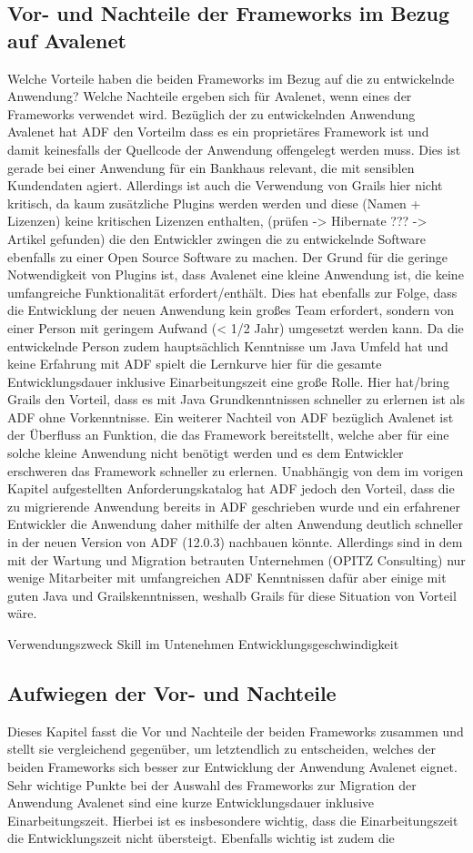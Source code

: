 \subsection{Vor- und Nachteile der Frameworks im Bezug auf Avalenet}
Welche Vorteile haben die beiden Frameworks im Bezug auf die zu entwickelnde Anwendung?
Welche Nachteile ergeben sich für Avalenet, wenn eines der Frameworks verwendet wird.
Bezüglich der zu entwickelnden Anwendung Avalenet hat ADF den Vorteilm dass es ein proprietäres Framework ist und damit keinesfalls der Quellcode der Anwendung offengelegt werden muss. Dies ist gerade bei einer Anwendung für ein Bankhaus relevant, die mit sensiblen Kundendaten agiert. Allerdings ist auch die Verwendung von Grails hier nicht kritisch, da kaum zusätzliche Plugins werden werden und diese (Namen + Lizenzen) keine kritischen Lizenzen enthalten, (prüfen -> Hibernate ??? -> Artikel gefunden) die den Entwickler zwingen die zu entwickelnde Software ebenfalls zu einer Open Source Software zu machen. Der Grund für die geringe Notwendigkeit von Plugins ist, dass Avalenet eine kleine Anwendung ist, die keine umfangreiche Funktionalität erfordert/enthält. Dies hat ebenfalls zur Folge, dass die Entwicklung der neuen Anwendung kein großes Team erfordert, sondern von einer Person mit geringem Aufwand (< 1/2 Jahr) umgesetzt werden kann. Da die entwickelnde Person zudem hauptsächlich Kenntnisse um Java Umfeld hat und keine Erfahrung mit ADF spielt die Lernkurve hier für die gesamte Entwicklungsdauer inklusive Einarbeitungszeit eine große Rolle. Hier hat/bring Grails den Vorteil, dass es mit Java Grundkenntnissen schneller zu erlernen ist als ADF ohne Vorkenntnisse. Ein weiterer Nachteil von ADF bezüglich Avalenet ist der Überfluss an Funktion, die das Framework bereitstellt, welche aber für eine solche kleine Anwendung nicht benötigt werden und es dem Entwickler erschweren das Framework schneller zu erlernen. Unabhängig von dem im vorigen Kapitel aufgestellten Anforderungskatalog hat ADF jedoch den Vorteil, dass die zu migrierende Anwendung bereits in ADF geschrieben wurde und ein erfahrener Entwickler die Anwendung daher mithilfe der alten Anwendung deutlich schneller in der neuen Version von ADF (12.0.3) nachbauen könnte. Allerdings sind in dem mit der Wartung und Migration betrauten Unternehmen (OPITZ Consulting) nur wenige Mitarbeiter mit umfangreichen ADF Kenntnissen dafür aber einige mit guten Java und Grailskenntnissen, weshalb Grails für diese Situation von Vorteil wäre.

Verwendungszweck
Skill im Untenehmen
Entwicklungsgeschwindigkeit

\subsection{Aufwiegen der Vor- und Nachteile}
Dieses Kapitel fasst die Vor und Nachteile der beiden Frameworks zusammen und stellt sie vergleichend gegenüber, um letztendlich zu entscheiden, welches der beiden Frameworks sich besser zur Entwicklung der Anwendung Avalenet eignet.
Sehr wichtige Punkte bei der Auswahl des Frameworks zur Migration der Anwendung Avalenet sind eine kurze Entwicklungsdauer inklusive Einarbeitungszeit. Hierbei ist es insbesondere wichtig, dass die Einarbeitungszeit die Entwicklungszeit nicht übersteigt. Ebenfalls wichtig ist zudem die
